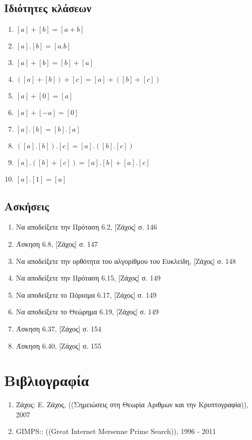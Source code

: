 \documentclass[11pt,a4paper]{book}
\begin{document}
\subsection*{Ιδιότητες κλάσεων}
\begin{enumerate}
	\item $[a] + [b] = [a + b]$
	\item $[a].[b] = [a.b]$
	\item $[a] + [b] = [b] + [a]$
	\item $([a] + [b]) + [c] = [a] + ([b] + [c])$
	\item $[a] + [0] = [a]$
	\item $[a] + [-a] = [0]$
	\item $[a].[b] = [b].[a]$
	\item $([a].[b]).[c] = [a].([b].[c])$
	\item $[a].([b]+[c]) = [a].[b] + [a].[c]$
	\item $[a].[1] = [a]$
\end{enumerate}

\subsection*{Ασκήσεις}
\begin{enumerate}
	\item Να αποδείξετε την Πρόταση 6.2, [Ζάχος] σ. 146
	\item Άσκηση 6.8, [Ζάχος] σ. 147
	\item Να αποδείξετε την ορθότητα του αλγορίθμου του Ευκλείδη, [Ζάχος] σ. 148
	\item Να αποδείξετε την Πρόταση 6.15, [Ζάχος] σ. 149
	\item Να αποδείξετε το Πόρισμα 6.17, [Ζάχος] σ. 149
	\item Να αποδείξετε το Θεώρημα 6.19, [Ζάχος] σ. 149
	\item Άσκηση 6.37, [Ζάχος] σ. 154
	\item Άσκηση 6.40, [Ζάχος] σ. 155
\end{enumerate}

\section*{Βιβλιογραφία}
\begin{enumerate}
	\item \text{[}Ζάχος\text{]}: Ε. Ζάχος, ((Σημειώσεις στη Θεωρία Αριθμων και την Κρυπτογραφία)), 2007
	\item \text{[}\textlatin{GIMPS}\text{]}:: ((\textlatin{Great Internet Mersenne Prime Search})), 1996 - 2011
\end{enumerate}
\end{document}

